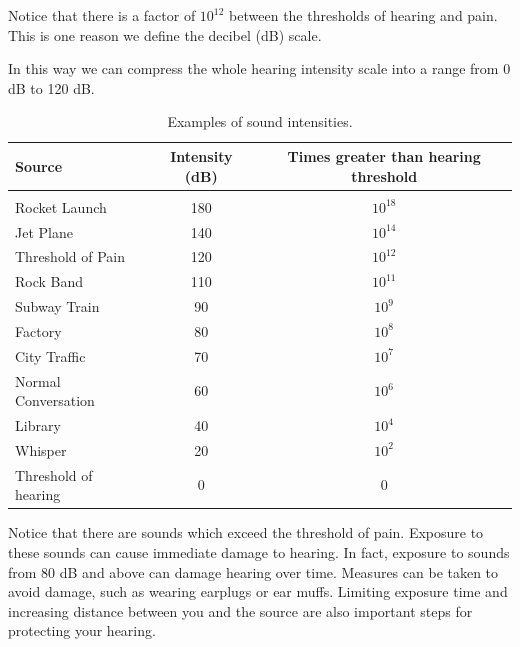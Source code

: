 Notice that there is a factor of $10^{12}$ between the thresholds of
hearing and pain. This is one reason we define the decibel (dB) scale.


In this way we can compress the whole hearing intensity scale into a
range from 0 dB to 120 dB.

\begin{table}[H]
\begin{center}
\caption{Examples of sound intensities.}
\label{p:wsl:s11:intensity}
\begin{tabular}{|l|c|c|}\hline
\textbf{Source}&\textbf{Intensity} (dB) & \textbf{Times greater than hearing threshold}\\\hline
& & \\
Rocket Launch &180 & $10^{18}$\\
Jet Plane & 140 & $10^{14}$ \\
Threshold of Pain & 120 & $10^{12}$\\
Rock Band & 110 & $10^{11}$\\
Subway Train & 90 & $10^{9}$\\
Factory & 80 & $10^{8}$\\
City Traffic & 70 & $10^{7}$\\
Normal Conversation & 60 & $10^{6}$\\
Library & 40 & $10^{4}$\\
Whisper & 20 & $10^{2}$\\
Threshold of hearing & 0 & 0\\
\hline
\end{tabular}
\end{center}
\end{table}

Notice that there are sounds which exceed the threshold
of pain. Exposure to these sounds can cause immediate damage to hearing.
In fact, exposure to sounds from
80 dB and above can damage hearing over time. Measures
can be taken to avoid damage, such as wearing earplugs
or ear muffs. Limiting exposure time and
increasing distance between you and the source are also
important steps for protecting your hearing.

